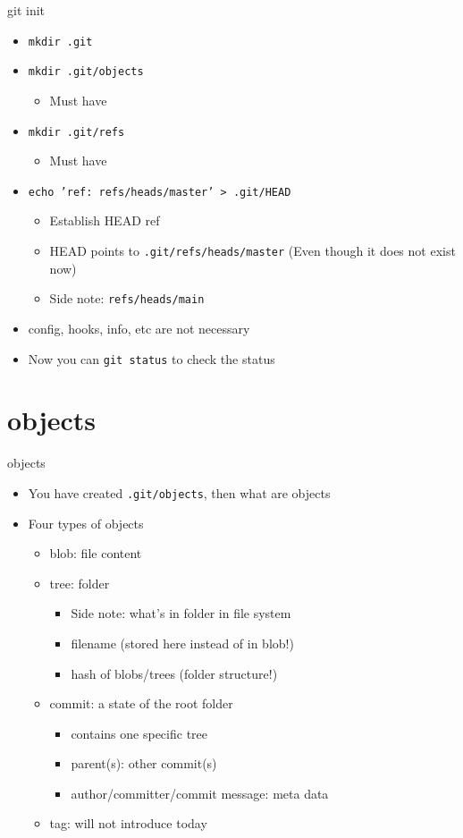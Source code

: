 \documentclass[aspectratio=169]{beamer}
\newcommand{\T}[1]{\texttt{#1}}
\begin{document}
\begin{frame}{git init}
  \begin{itemize}
    \item \T{mkdir .git}
    \item \T{mkdir .git/objects}\begin{itemize}
      \item Must have
    \end{itemize}
    \item \T{mkdir .git/refs}\begin{itemize}
      \item Must have
    \end{itemize}
    \item \T{echo 'ref: refs/heads/master' > .git/HEAD}\begin{itemize}
      \item Establish {HEAD} ref
      \item HEAD points to \T{.git/refs/heads/master} (Even though it does not exist now)
      \item Side note: \T{refs/heads/main}
    \end{itemize}
    \item config, hooks, info, etc are not necessary
    \item Now you can \T{git status} to check the status
  \end{itemize}
\end{frame}

\section{objects}
\begin{frame}{objects}
  \begin{itemize}
    \item<1-> You have created \T{.git/objects}, then what are objects
    \item<2-> Four types of objects\begin{itemize}
      \item<3-> blob: file content
      \item<4-> tree: folder\begin{itemize}
        \item Side note: what's in folder in file system
        \item filename (stored here instead of in blob!)
        \item hash of blobs/trees (folder structure!)
      \end{itemize}
      \item<5-> commit: a state of the root folder\begin{itemize}
        \item contains one specific tree
        \item parent(s): other commit(s)
        \item author/committer/commit message: meta data
      \end{itemize}
      \item<6-> tag: will not introduce today
    \end{itemize}
  \end{itemize}
\end{frame}
\end{document}
